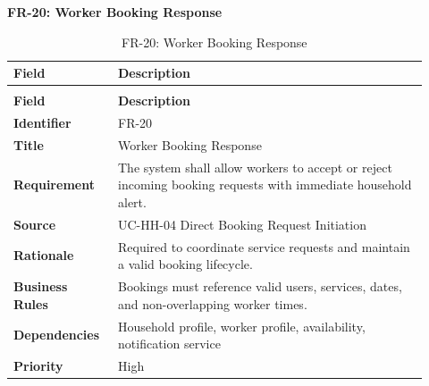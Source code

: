 \documentclass[12pt,a4paper]{article}
\begin{document}
\noindent\textbf{FR-20: Worker Booking Response}\par
\vspace{4pt}
\begingroup\small\setlength{\tabcolsep}{4pt}\renewcommand{\arraystretch}{1.15}
\begin{longtable}{|>{\raggedright\arraybackslash}p{0.22\linewidth}|>{\raggedright\arraybackslash}p{0.70\linewidth}|}
\caption{FR-20: Worker Booking Response}\label{tab:fr-20}\\
\hline
\textbf{Field} & \textbf{Description} \\ \hline
\endfirsthead
\multicolumn{2}{c}{Table \thetable\ Worker Booking Response (continued)}\\
\hline
\textbf{Field} & \textbf{Description} \\ \hline
\endhead
\textbf{Identifier} & FR-20 \\ \hline
\textbf{Title} & Worker Booking Response \\ \hline
\textbf{Requirement} & The system shall allow workers to accept or reject incoming booking requests with immediate household alert. \\ \hline
\textbf{Source} & UC-HH-04 Direct Booking Request Initiation \\ \hline
\textbf{Rationale} & Required to coordinate service requests and maintain a valid booking lifecycle. \\ \hline
\textbf{Business Rules} & Bookings must reference valid users, services, dates, and non-overlapping worker times. \\ \hline
\textbf{Dependencies} & Household profile, worker profile, availability, notification service \\ \hline
\textbf{Priority} & High \\ \hline
\end{longtable}
\endgroup
\clearpage
\end{document}
